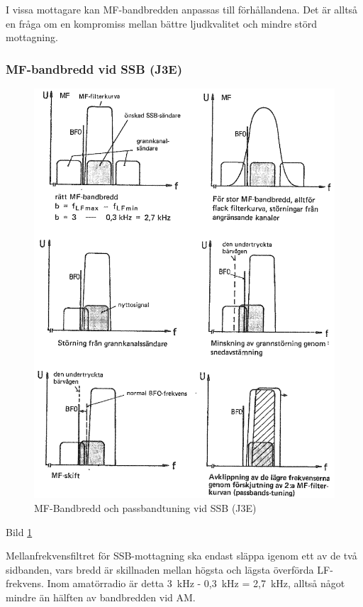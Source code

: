 I vissa mottagare kan MF-bandbredden anpassas till förhållandena. Det
är alltså en fråga om en kompromiss mellan bättre ljudkvalitet och
mindre störd mottagning.

\subsubsection{MF-bandbredd vid SSB (J3E)}

\begin{figure}
  \includegraphics[width=\textwidth]{images/cropped_pdfs/bild_2_4-27.pdf}
  \caption{MF-Bandbredd och passbandtuning vid SSB (J3E)}
  \label{fig:bildII4-27}
\end{figure}

Bild \ref{fig:bildII4-27}

Mellanfrekvensfiltret för SSB-mottagning ska endast släppa igenom
ett av de två sidbanden, vars bredd är skillnaden mellan högsta och
lägsta överförda LF-frekvens. Inom amatörradio är detta 3~kHz - 0,3~kHz
= 2,7~kHz, alltså något mindre än hälften av bandbredden vid AM.

